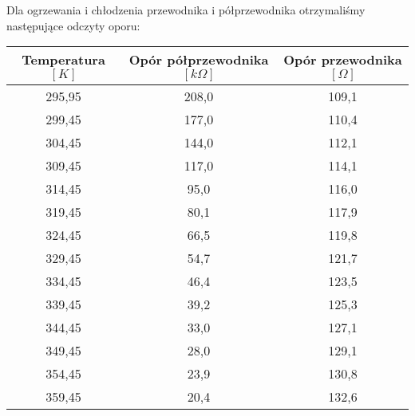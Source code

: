 \documentclass[10pt,a4paper]{article}
\newcommand{\forceindent}{\leavevmode{\parindent=3em\indent}}
\begin{document}
\forceindent Dla ogrzewania i chłodzenia przewodnika i półprzewodnika otrzymaliśmy następujące odczyty oporu:\\
\vspace{10pt}
\begin{center}
\begin{tabular}{|c|c|c|}
\hline
Temperatura $[K]$ & Opór półprzewodnika $[k\Omega]$ & Opór przewodnika $[\Omega]$\\
\hline
295,95&208,0&109,1\\ 
 \hline 
299,45&177,0&110,4\\ 
 \hline 
304,45&144,0&112,1\\ 
 \hline 
309,45&117,0&114,1\\ 
 \hline 
314,45&95,0&116,0\\ 
 \hline 
319,45&80,1&117,9\\ 
 \hline 
324,45&66,5&119,8\\ 
 \hline 
329,45&54,7&121,7\\ 
 \hline 
334,45&46,4&123,5\\ 
 \hline 
339,45&39,2&125,3\\ 
 \hline 
344,45&33,0&127,1\\ 
 \hline 
349,45&28,0&129,1\\ 
 \hline 
354,45&23,9&130,8\\ 
 \hline 
359,45&20,4&132,6\\ 
 \hline 
\end{tabular}
\end{center}
\end{document}
